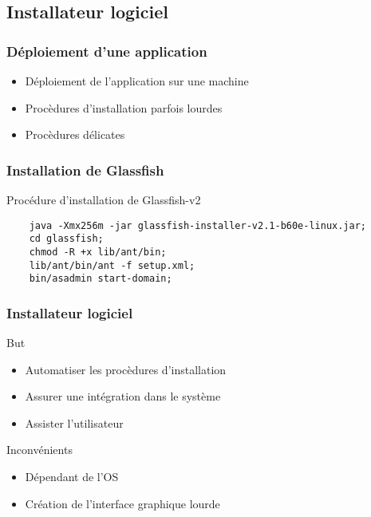 \subsection{Installateur logiciel}
\begin{frame}\frametitle{Déploiement d'une application}
\begin{itemize}
 \item Déploiement de l'application sur une machine
 \item Procèdures d'installation parfois lourdes
 \item Procèdures délicates
\end{itemize}
\end{frame}
\begin{frame}[fragile]\frametitle{Installation de Glassfish}
\begin{block}{Procédure d'installation de Glassfish-v2}
	\begin{verbatim}
	java -Xmx256m -jar glassfish-installer-v2.1-b60e-linux.jar;
	cd glassfish;
	chmod -R +x lib/ant/bin;
	lib/ant/bin/ant -f setup.xml;
	bin/asadmin start-domain;
	\end{verbatim}
\end{block}
\end{frame}
\begin{frame}\frametitle{Installateur logiciel}
\begin{block}{But}
 \begin{itemize}
  \item Automatiser les procèdures d'installation
  \item Assurer une intégration dans le système
  \item Assister l'utilisateur
 \end{itemize}
\end{block}
\begin{block}{Inconvénients}
 \begin{itemize}
  \item Dépendant de l'OS
  \item Création de l'interface graphique lourde
 \end{itemize}
\end{block}
\end{frame}
